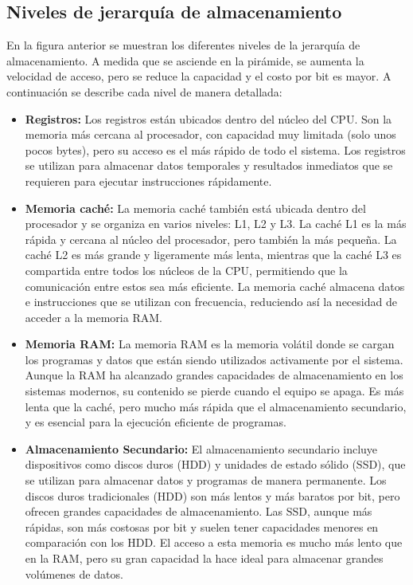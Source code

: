 \subsection{Niveles de jerarquía de almacenamiento}
En la figura anterior se muestran los diferentes niveles de la jerarquía de almacenamiento. A medida que se asciende en la pirámide, se aumenta la velocidad de acceso, pero se reduce la capacidad y el costo por bit es mayor. A continuación se describe cada nivel de manera detallada:


 \begin{tcolorbox}[title= Níveles de almacenamiento]
	\begin{itemize}
		
		
		\item \textbf{Registros:}
		Los registros están ubicados dentro del núcleo del CPU. Son la memoria más cercana al procesador, con capacidad muy limitada (solo unos pocos bytes), pero su acceso es el más rápido de todo el sistema. Los registros se utilizan para almacenar datos temporales y resultados inmediatos que se requieren para ejecutar instrucciones rápidamente.
		\item \textbf{Memoria caché:}
		La memoria caché también está ubicada dentro del procesador y se organiza en varios niveles: L1, L2 y L3. La caché L1 es la más rápida y cercana al núcleo del procesador, pero también la más pequeña. La caché L2 es más grande y ligeramente más lenta, mientras que la caché L3 es compartida entre todos los núcleos de la CPU, permitiendo que la comunicación entre estos sea más eficiente. La memoria caché almacena datos e instrucciones que se utilizan con frecuencia, reduciendo así la necesidad de acceder a la memoria RAM.
		\item \textbf{Memoria RAM:}
		La memoria RAM es la memoria volátil donde se cargan los programas y datos que están siendo utilizados activamente por el sistema. Aunque la RAM ha alcanzado grandes capacidades de almacenamiento en los sistemas modernos, su contenido se pierde cuando el equipo se apaga. Es más lenta que la caché, pero mucho más rápida que el almacenamiento secundario, y es esencial para la ejecución eficiente de programas.
		\item \textbf{Almacenamiento Secundario:}
		El almacenamiento secundario incluye dispositivos como discos duros (HDD) y unidades de estado sólido (SSD), que se utilizan para almacenar datos y programas de manera permanente. Los discos duros tradicionales (HDD) son más lentos y más baratos por bit, pero ofrecen grandes capacidades de almacenamiento. Las SSD, aunque más rápidas, son más costosas por bit y suelen tener capacidades menores en comparación con los HDD. El acceso a esta memoria es mucho más lento que en la RAM, pero su gran capacidad la hace ideal para almacenar grandes volúmenes de datos.
		
	\end{itemize}
\end{tcolorbox}



